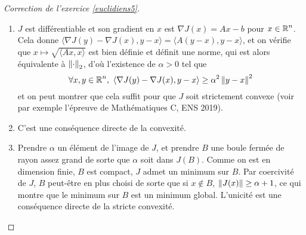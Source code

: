\begin{proof}[Correction de l'exercice \ref{euclidiens5}]
	\begin{enumerate}
		\item $J$ est différentiable et son gradient en $x$ est $\nabla J(x)=Ax-b$ pour $x\in \operatorname{\mathbb R}^n$.
		Cela donne $\langle \nabla J(y)-\nabla J(x),y-x\rangle=\langle A(y-x),y-x\rangle$, 
		et on vérifie que $x\mapsto\sqrt{\langle Ax,x\rangle}$ est bien définie et définit une norme,
		qui est alors équivalente à $\left\lVert \cdot\right\rVert_2$, d'où l'existence de $\alpha >0$ tel que 
		\[
			\forall x,y\in\operatorname{\mathbb R}^n,\ \langle \nabla J(y)-\nabla J(x),y-x\rangle\geq\alpha^2\left\lVert y-x\right\rVert^2
		\]
		et on peut montrer que cela suffit pour que $J$ soit strictement convexe (voir par exemple l'épreuve de Mathématiques C, ENS 2019).
		\item C'est une conséquence directe de la convexité.
		\item Prendre $\alpha$ un élément de l'image de $J$, et prendre $B$ une boule fermée de rayon assez grand de sorte que $\alpha$ soit dans $J(B)$.
		Comme on est en dimension finie, $B$ est compact, $J$ admet un minimum sur $B$.
		Par coercivité de $J$, $B$ peut-être en plus choisi de sorte que si $x\notin B$, $\left\lVert J(x)\right\rVert\geq\alpha+1$, ce qui montre que le minimum sur $B$ est un minimum global.
		L'unicité est une conséquence directe de la stricte convexité.
	\end{enumerate}
\end{proof}

